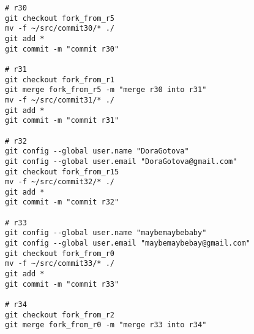 \thispagestyle{empty}
\BgThispage
\tiny
\begin{verbatim}
# r30
git checkout fork_from_r5
mv -f ~/src/commit30/* ./
git add *
git commit -m "commit r30"

# r31
git checkout fork_from_r1
git merge fork_from_r5 -m "merge r30 into r31"
mv -f ~/src/commit31/* ./
git add *
git commit -m "commit r31"

# r32
git config --global user.name "DoraGotova"
git config --global user.email "DoraGotova@gmail.com"
git checkout fork_from_r15
mv -f ~/src/commit32/* ./
git add *
git commit -m "commit r32"

# r33
git config --global user.name "maybemaybebaby"
git config --global user.email "maybemaybebay@gmail.com"
git checkout fork_from_r0
mv -f ~/src/commit33/* ./
git add *
git commit -m "commit r33"

# r34
git checkout fork_from_r2
git merge fork_from_r0 -m "merge r33 into r34"
\end{verbatim}
\normalsize